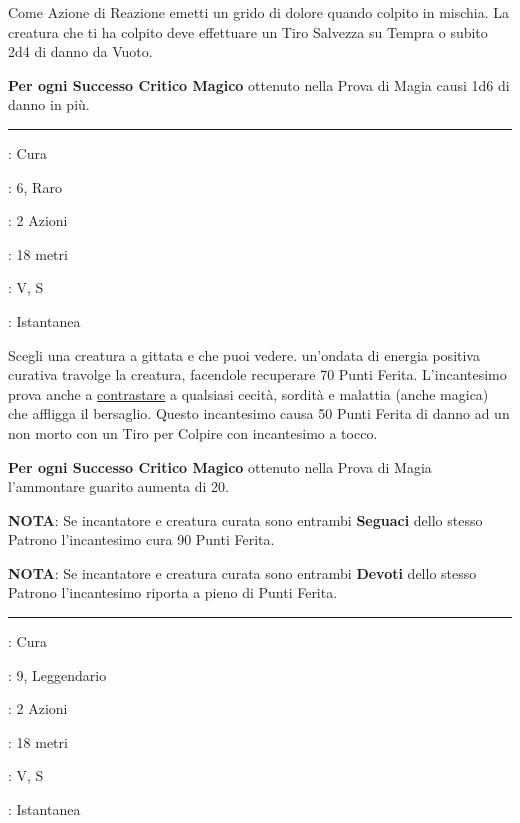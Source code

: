 \begin{multicols}{2}
Come Azione di Reazione emetti un grido di dolore quando colpito in mischia. La creatura che ti ha colpito deve effettuare un Tiro Salvezza su Tempra o subito 2d4 di danno da Vuoto.

\textbf{Per ogni Successo Critico Magico} ottenuto nella Prova di Magia causi 1d6 di danno in più.

\smallskip\noindent\rule{\linewidth}{2pt} \hypertarget{Guarigione}{}\medskip{}
\noindent
\begin{description}[noitemsep, topsep=0pt, parsep=0pt, partopsep=0pt, leftmargin=0cm, labelwidth=2.8cm]
	\item[\textbf{Lista di Magia}]: Cura
	\item[\textbf{Livello}]: 6, Raro
	\item[\textbf{T. di Lancio}]: 2 Azioni
	\item[\textbf{Gittata}]: 18 metri
	\item[\textbf{Componenti}]: V, S
	\item[\textbf{Durata}]: Istantanea
\end{description}

Scegli una creatura a gittata e che puoi vedere. un'ondata di energia positiva curativa travolge la creatura, facendole recuperare 70 Punti Ferita. L'incantesimo prova anche a \hyperlink{contrastareincantesimi}{contrastare} a qualsiasi cecità, sordità e malattia (anche magica) che affligga il bersaglio. Questo incantesimo causa 50 Punti Ferita di danno ad un non morto con un Tiro per Colpire con incantesimo a tocco.

\textbf{Per ogni Successo Critico Magico} ottenuto nella Prova di Magia l'ammontare guarito aumenta di 20.

\textbf{NOTA}: Se incantatore e creatura curata sono entrambi \textbf{Seguaci} dello stesso Patrono l'incantesimo cura 90 Punti Ferita.

\textbf{NOTA}: Se incantatore e creatura curata sono entrambi \textbf{Devoti} dello stesso Patrono l'incantesimo riporta a pieno di Punti Ferita.

\smallskip\noindent\rule{\linewidth}{2pt} \hypertarget{Guarigione di Massa}{}\medskip{}
\noindent
\begin{description}[noitemsep, topsep=0pt, parsep=0pt, partopsep=0pt, leftmargin=0cm, labelwidth=2.8cm]
	\item[\textbf{Lista di Magia}]: Cura
	\item[\textbf{Livello}]: 9, Leggendario
	\item[\textbf{T. di Lancio}]: 2 Azioni
	\item[\textbf{Gittata}]: 18 metri
	\item[\textbf{Componenti}]: V, S
	\item[\textbf{Durata}]: Istantanea
\end{description}


\end{multicols}
